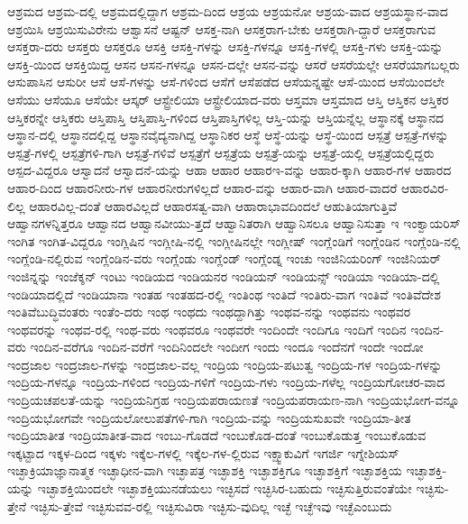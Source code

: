 {ಆಶ್ರಮದ
ಆಶ್ರಮ-ದಲ್ಲಿ
ಆಶ್ರಮದಲ್ಲಿದ್ದಾಗ
ಆಶ್ರಮ-ದಿಂದ
ಆಶ್ರಯ
ಆಶ್ರಯನೋ
ಆಶ್ರಯ-ವಾದ
ಆಶ್ರಯಸ್ಥಾನ-ವಾದ
ಆಶ್ರಯಿಸಿ
ಆಶ್ರಯಿಸುವಿರೇನು
ಆಶ್ವಾಸನೆ
ಆಷ್ಟನ್
ಆಸಕ್ತ-ನಾಗಿ
ಆಸಕ್ತರಾಗ-ಬೇಕು
ಆಸಕ್ತರಾಗಿ-ದ್ದಾರೆ
ಆಸಕ್ತರಾಗುವ
ಆಸಕ್ತರಾ-ದರು
ಆಸಕ್ತರು
ಆಸಕ್ತರೂ
ಆಸಕ್ತಿ
ಆಸಕ್ತಿ-ಗಳನ್ನು
ಆಸಕ್ತಿ-ಗಳನ್ನೂ
ಆಸಕ್ತಿ-ಗಳಲ್ಲಿ
ಆಸಕ್ತಿ-ಗಳು
ಆಸಕ್ತಿ-ಯನ್ನು
ಆಸಕ್ತಿ-ಯಿಂದ
ಆಸಕ್ತಿಯಿದ್ದ
ಆಸನ
ಆಸನ-ಗಳನ್ನೂ
ಆಸನ-ದಲ್ಲೇ
ಆಸನ-ವನ್ನು
ಆಸರೆ
ಆಸರೆಯಲ್ಲೇ
ಆಸರೆಯಾಗಬಲ್ಲರು
ಆಸುಪಾಸಿನ
ಆಸುರೀ
ಆಸೆ
ಆಸೆ-ಗಳನ್ನು
ಆಸೆ-ಗಳಿಂದ
ಆಸೆಗೆ
ಆಸೆಪಡೆದ
ಆಸೆಯನ್ನಷ್ಟೇ
ಆಸೆ-ಯಿಂದ
ಆಸೆಯಿಂದಲೇ
ಆಸೆಯು
ಆಸೆಯೂ
ಆಸೆಯೇ
ಆಸ್ಕರ್
ಆಸ್ಟ್ರೇಲಿಯಾ
ಆಸ್ಟ್ರೇಲಿಯಾದ-ವರು
ಆಸ್ತಮಾ
ಆಸ್ತಮಾದ
ಆಸ್ತಿ
ಆಸ್ತಿಕನ
ಆಸ್ತಿಕರ
ಆಸ್ತಿಕರನ್ನೇ
ಆಸ್ತಿಕರು
ಆಸ್ತಿಪಾಸ್ತಿ
ಆಸ್ತಿಪಾಸ್ತಿ-ಗಳಿಂದ
ಆಸ್ತಿಪಾಸ್ತಿಗಳಿಲ್ಲ
ಆಸ್ತಿ-ಯನ್ನು
ಆಸ್ತಿಯನ್ನೆಲ್ಲ
ಆಸ್ಥಾನಕ್ಕೆ
ಆಸ್ಥಾನದ
ಆಸ್ಥಾನ-ದಲ್ಲಿ
ಆಸ್ಥಾನದಲ್ಲಿದ್ದ
ಆಸ್ಥಾನವೈದ್ಯನಾಗಿದ್ದ
ಆಸ್ಥಾನಿಕರ
ಆಸ್ಥೆ
ಆಸ್ಥೆ-ಯನ್ನು
ಆಸ್ಥೆ-ಯಿಂದ
ಆಸ್ಪತ್ರೆ
ಆಸ್ಪತ್ರೆ-ಗಳನ್ನು
ಆಸ್ಪತ್ರೆ-ಗಳಲ್ಲಿ
ಆಸ್ಪತ್ರೆಗಳಿ-ಗಾಗಿ
ಆಸ್ಪತ್ರೆ-ಗಳಿವೆ
ಆಸ್ಪತ್ರೆಗೆ
ಆಸ್ಪತ್ರೆಯ
ಆಸ್ಪತ್ರೆ-ಯನ್ನು
ಆಸ್ಪತ್ರೆ-ಯಲ್ಲಿ
ಆಸ್ಪತ್ರೆಯಲ್ಲಿದ್ದರು
ಆಸ್ಪದ-ವಿದ್ದರೂ
ಆಸ್ವಾದನೆ
ಆಸ್ವಾದನೆ-ಯನ್ನು
ಆಹಾ
ಆಹಾರ
ಆಹಾರಇ-ವನ್ನು
ಆಹಾರ-ಕ್ಕಾಗಿ
ಆಹಾರ-ಗಳ
ಆಹಾರದ
ಆಹಾರ-ದಿಂದ
ಆಹಾರನೀರು-ಗಳ
ಆಹಾರನೀರುಗಳಿಲ್ಲದೆ
ಆಹಾರ-ವನ್ನು
ಆಹಾರ-ವಾಗಿ
ಆಹಾರ-ವಾದರೆ
ಆಹಾರವಿರ-ಲಿಲ್ಲ
ಆಹಾರವಿಲ್ಲ-ದಂತೆ
ಆಹಾರವಿಲ್ಲದೆ
ಆಹಾರಸತ್ವ-ವಾಗಿ
ಆಹಾರಾಭಾವದಿಂದಲೆ
ಆಹುತಿಯಾಗುತ್ತಿವೆ
ಆಹ್ವಾನಗಳನ್ನಿತ್ತರೂ
ಆಹ್ವಾನದ
ಆಹ್ವಾನವೀಯು-ತ್ತದೆ
ಆಹ್ವಾನಿತರಾಗಿ
ಆಹ್ವಾನಿಸಲೂ
ಆಹ್ವಾನಿಸುತ್ತಾ
ಇ
ಇಂಕ್ವಾಯರಿಸ್
ಇಂಗಿತ
ಇಂಗಿತ-ವಿದ್ದರೂ
ಇಂಗ್ಲಿಷಿನ
ಇಂಗ್ಲೀಷಿ-ನಲ್ಲಿ
ಇಂಗ್ಲೀಷಿನಲ್ಲೇ
ಇಂಗ್ಲೀಷ್
ಇಂಗ್ಲೆಂಡಿಗೆ
ಇಂಗ್ಲೆಂಡಿನ
ಇಂಗ್ಲೆಂಡಿ-ನಲ್ಲಿ
ಇಂಗ್ಲೆಂಡಿ-ನಲ್ಲಿರುವ
ಇಂಗ್ಲೆಂಡಿನ-ವರು
ಇಂಗ್ಲೆಂಡು
ಇಂಗ್ಲೆಂಡ್
ಇಂಗ್ಲೆಂಡ್ನ
ಇಂಚು
ಇಂಜಿನಿಯರಿಂಗ್
ಇಂಜಿನಿಯರ್
ಇಂಜಿನ್ನನ್ನು
ಇಂಜೆಕ್ಶನ್
ಇಂಟು
ಇಂಡಿಯದ
ಇಂಡಿಯನರ
ಇಂಡಿಯನ್
ಇಂಡಿಯನ್ಸ್
ಇಂಡಿಯಾ
ಇಂಡಿಯಾ-ದಲ್ಲಿ
ಇಂಡಿಯಾದಲ್ಲಿದೆ
ಇಂಡಿಯಾನಾ
ಇಂತಹ
ಇಂತಹದ-ರಲ್ಲಿ
ಇಂತಿಂಥ
ಇಂತಿದೆ
ಇಂತಿರು-ವಾಗ
ಇಂತಿವೆ
ಇಂತಿವೆದೇಶ
ಇಂತಿವೆಬುದ್ಧಿವಂತರು
ಇಂತೆಂ-ದರು
ಇಂಥ
ಇಂಥದು
ಇಂಥದ್ದಾಗಿತ್ತು
ಇಂಥವ-ನನ್ನು
ಇಂಥವನು
ಇಂಥವರ
ಇಂಥವರನ್ನು
ಇಂಥವ-ರಲ್ಲಿ
ಇಂಥ-ವರು
ಇಂಥವರೂ
ಇಂಥವರೇ
ಇಂದಿಂದೇ
ಇಂದಿಗೂ
ಇಂದಿಗೆ
ಇಂದಿನ
ಇಂದಿನ-ವರು
ಇಂದಿನ-ವರೆಗೂ
ಇಂದಿನ-ವರೆಗೆ
ಇಂದಿನಿಂದಲೇ
ಇಂದೀಗ
ಇಂದು
ಇಂದೂ
ಇಂದೆನಗೆ
ಇಂದೇ
ಇಂದೋ
ಇಂದ್ರಜಾಲ
ಇಂದ್ರಜಾಲ-ಗಳನ್ನು
ಇಂದ್ರಜಾಲ-ವಲ್ಲ
ಇಂದ್ರಿಯ
ಇಂದ್ರಿಯ-ಪಟುತ್ವ
ಇಂದ್ರಿಯ-ಗಳ
ಇಂದ್ರಿಯ-ಗಳನ್ನು
ಇಂದ್ರಿಯ-ಗಳನ್ನೂ
ಇಂದ್ರಿಯ-ಗಳಿಂದ
ಇಂದ್ರಿಯ-ಗಳಿಗೆ
ಇಂದ್ರಿಯ-ಗಳು
ಇಂದ್ರಿಯ-ಗಳೆಲ್ಲ
ಇಂದ್ರಿಯಗೋಚರ-ವಾದ
ಇಂದ್ರಿಯಚಪಲತೆ-ಯನ್ನು
ಇಂದ್ರಿಯನಿಗ್ರಹ
ಇಂದ್ರಿಯಪರಾಯಣತೆ
ಇಂದ್ರಿಯಪರಾಯಣ-ನಾಗಿ
ಇಂದ್ರಿಯಭೋಗ-ವನ್ನೂ
ಇಂದ್ರಿಯಭೋಗವೇ
ಇಂದ್ರಿಯಲೋಲುಪತೆಗಳಿ-ಗಾಗಿ
ಇಂದ್ರಿಯ-ವನ್ನು
ಇಂದ್ರಿಯಸುಖವೇ
ಇಂದ್ರಿಯಾ-ತೀತ
ಇಂದ್ರಿಯಾತೀತ
ಇಂದ್ರಿಯಾತೀತ-ವಾದ
ಇಂಬು-ಗೊಡದೆ
ಇಂಬುಕೊಡ-ದಂತೆ
ಇಂಬುಕೊಡುತ್ತ
ಇಂಬುಕೊಡುವ
ಇಕ್ಕಟ್ಟಾದ
ಇಕ್ಕಳ-ದಿಂದ
ಇಕ್ಕಳು
ಇಕ್ಕೆಲ-ಗಳಲ್ಲಿ
ಇಕ್ಕೆಲ-ಗಳ-ಲ್ಲಿರುವ
ಇಕ್ಷ್ವಾಕುವಿಗೆ
ಇಗರ್ಜಿ
ಇಗ್ನೇಶಿಯಸ್
ಇಚ್ಛಾಕ್ರಿಯಾಜ್ಞಾನಾತ್ಮಕ
ಇಚ್ಛಾಧೀನ-ವಾಗಿ
ಇಚ್ಛಾಪತ್ರ
ಇಚ್ಛಾಶಕ್ತಿ
ಇಚ್ಛಾಶಕ್ತಿಗೂ
ಇಚ್ಛಾಶಕ್ತಿಗೆ
ಇಚ್ಛಾಶಕ್ತಿಯ
ಇಚ್ಛಾಶಕ್ತಿ-ಯನ್ನು
ಇಚ್ಛಾಶಕ್ತಿಯಿಂದಲೇ
ಇಚ್ಛಾಶಕ್ತಿಯುನಡೆಯಲು
ಇಚ್ಛಿಸದೆ
ಇಚ್ಛಿಸಿರ-ಬಹುದು
ಇಚ್ಛಿಸುತ್ತಿರುವಂತೆಯೇ
ಇಚ್ಛಿಸು-ತ್ತೇನೆ
ಇಚ್ಛಿಸು-ತ್ತೇವೆ
ಇಚ್ಛಿಸುವವ-ರಲ್ಲಿ
ಇಚ್ಛಿಸುವಿರಾ
ಇಚ್ಛಿಸು-ವುದಿಲ್ಲ
ಇಚ್ಛೆ
ಇಚ್ಛೆಇವು
ಇಚ್ಛೆಎಂಬುದು
}

